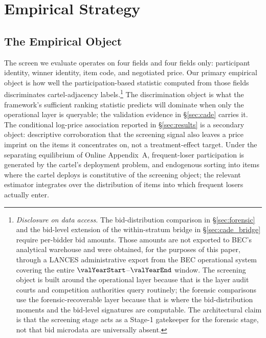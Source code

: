 \section{Empirical Strategy}
\label{sec:empirical}

\subsection{The Empirical Object}
\label{sec:emp_estimand}

The screen we evaluate operates on four fields and four fields
only: participant identity, winner identity, item code, and
negotiated price. Our primary empirical object is how well the
participation-based statistic computed from those fields
discriminates cartel-adjacency labels.\footnote{\emph{Disclosure
on data access.} The bid-distribution comparison in
\S\ref{sec:forensic} and the bid-level extension of the
within-stratum bridge in \S\ref{sec:cade_bridge} require
per-bidder bid amounts. Those amounts are not exported to BEC's
analytical warehouse and were obtained, for the purposes of this
paper, through a LANCES administrative export from the BEC
operational system covering the entire $\valYearStart$--$\valYearEnd$
window. The screening object is built around the operational
layer because that is the layer audit courts and competition
authorities query routinely; the forensic comparisons use the
forensic-recoverable layer because that is where the
bid-distribution moments and the bid-level signatures are
computable. The architectural claim is that the screening stage
acts as a Stage-1 gatekeeper for the forensic stage, not that
bid microdata are universally absent.} The discrimination object
is what the framework's sufficient ranking statistic predicts
will dominate when only the operational layer is queryable; the
validation evidence in \S\ref{sec:cade} carries it. The
conditional log-price association reported in \S\ref{sec:results}
is a secondary object: descriptive corroboration that the
screening signal also leaves a price imprint on the items it
concentrates on, not a treatment-effect target. Under the
separating equilibrium of Online Appendix~A, frequent-loser
participation is generated by the cartel's deployment problem,
and endogenous sorting into items where the cartel deploys is
constitutive of the screening object; the relevant estimator
integrates over the distribution of items into which frequent
losers actually enter.

